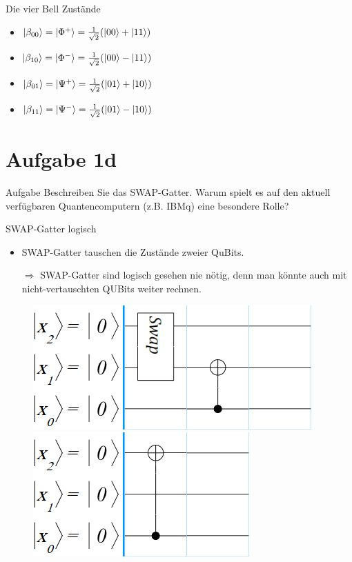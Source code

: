 \documentclass[fleqn,compress,utf8,aspectratio=169,t]{beamer}
\begin{document}
\begin{frame}{Die vier Bell Zustände}
\begin{itemize}
	\item $\ket{\beta_{00}} = \ket{\Phi^+} = \frac{1}{\sqrt{2}} (\ket{00} + \ket{11})$
	\item $\ket{\beta_{10}} = \ket{\Phi^-} = \frac{1}{\sqrt{2}} (\ket{00} - \ket{11})$
	\item $\ket{\beta_{01}} = \ket{\Psi^+} = \frac{1}{\sqrt{2}} (\ket{01} + \ket{10})$
	\item $\ket{\beta_{11}} = \ket{\Psi^-} = \frac{1}{\sqrt{2}} (\ket{01} - \ket{10})$
\end{itemize}
\end{frame}

\section{Aufgabe 1d}

\begin{frame}{Aufgabe}
Beschreiben Sie das SWAP-Gatter. Warum spielt es auf den aktuell verfügbaren
Quantencomputern (z.B. IBMq) eine besondere Rolle?
\end{frame}

\begin{frame}{SWAP-Gatter logisch}
\begin{itemize}
	\item SWAP-Gatter tauschen die Zustände zweier QuBits.
	\item[$\Rightarrow$] SWAP-Gatter sind logisch gesehen nie nötig, denn man könnte auch mit nicht-vertauschten QUBits weiter rechnen.
\end{itemize}

\begin{figure}
	\begin{minipage}{.5\textwidth}
		\centering
		\includegraphics[height=.3\textheight]{images/1d-mit-swap.png}
	\end{minipage}%
	\begin{minipage}{.5\textwidth}
		\centering
		\includegraphics[height=.3\textheight]{images/1d-ohne-swap.png}
	\end{minipage}
\end{figure}
\end{frame}
\end{document}
